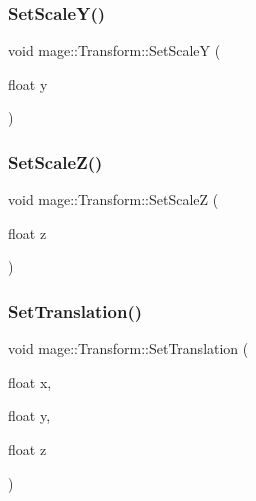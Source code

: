\subsubsection{\texorpdfstring{Set\+Scale\+Y()}{SetScaleY()}}
{\footnotesize\ttfamily void mage\+::\+Transform\+::\+Set\+ScaleY (\begin{DoxyParamCaption}\item[{float}]{y }\end{DoxyParamCaption})}

\hypertarget{structmage_1_1_transform_af8cd0167f776708697041544886ff2de}{}\label{structmage_1_1_transform_af8cd0167f776708697041544886ff2de} 
\subsubsection{\texorpdfstring{Set\+Scale\+Z()}{SetScaleZ()}}
{\footnotesize\ttfamily void mage\+::\+Transform\+::\+Set\+ScaleZ (\begin{DoxyParamCaption}\item[{float}]{z }\end{DoxyParamCaption})}

\hypertarget{structmage_1_1_transform_acf702bb57431be2986ca487e07189bda}{}\label{structmage_1_1_transform_acf702bb57431be2986ca487e07189bda} 
\subsubsection{\texorpdfstring{Set\+Translation()}{SetTranslation()}\hspace{0.1cm}{\footnotesize\ttfamily [1/2]}}
{\footnotesize\ttfamily void mage\+::\+Transform\+::\+Set\+Translation (\begin{DoxyParamCaption}\item[{float}]{x,  }\item[{float}]{y,  }\item[{float}]{z }\end{DoxyParamCaption})}

\hypertarget{structmage_1_1_transform_ad82e98f98d57cd3e9878336b6c3e804c}{}\label{structmage_1_1_transform_ad82e98f98d57cd3e9878336b6c3e804c} 
